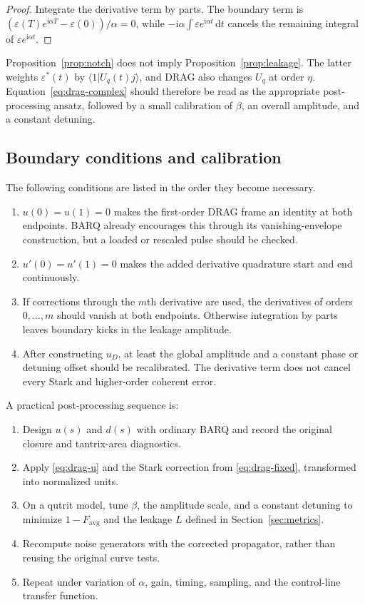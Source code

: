 \documentclass[11pt,a4paper]{article}
\theoremstyle{definition}
\newcommand{\braket}[2]{\langle #1\vert #2\rangle}
\newcommand{\dd}{\mathrm{d}}
\newcommand{\ii}{\mathrm{i}}
\newcommand{\eps}{\varepsilon}
\begin{document}
\begin{proof}
Integrate the derivative term by parts.  The boundary term is
\((\eps(T)e^{\ii\alpha T}-\eps(0))/\alpha=0\), while
\(-\ii\alpha\int\eps e^{\ii\alpha t}\,\dd t\) cancels the remaining integral of
\(\eps e^{\ii\alpha t}\).
\end{proof}

Proposition~\ref{prop:notch} does not imply
Proposition~\ref{prop:leakage}.  The latter weights \(\eps^*(t)\) by
\(\braket{1}{U_q(t)j}\), and DRAG also changes \(U_q\) at order \(\eta\).
Equation~\eqref{eq:drag-complex} should therefore be read as the appropriate
post-processing ansatz, followed by a small calibration of \(\beta\), an
overall amplitude, and a constant detuning.

\subsection{Boundary conditions and calibration}

The following conditions are listed in the order they become necessary.

\begin{enumerate}
  \item \(u(0)=u(1)=0\) makes the first-order DRAG frame an identity at both
        endpoints.  BARQ already encourages this through its vanishing-envelope
        construction, but a loaded or rescaled pulse should be checked.
  \item \(u'(0)=u'(1)=0\) makes the added derivative quadrature start and end
        continuously.
  \item If corrections through the \(m\)th derivative are used, the derivatives
        of orders \(0,\ldots,m\) should vanish at both endpoints.  Otherwise
        integration by parts leaves boundary kicks in the leakage amplitude.
  \item After constructing \(u_D\), at least the global amplitude and a
        constant phase or detuning offset should be recalibrated.  The
        derivative term does not cancel every Stark and higher-order coherent
        error.
\end{enumerate}

A practical post-processing sequence is:

\begin{enumerate}
  \item Design \(u(s)\) and \(d(s)\) with ordinary BARQ and record the original
        closure and tantrix-area diagnostics.
  \item Apply \eqref{eq:drag-u} and the Stark correction from
        \eqref{eq:drag-fixed}, transformed into normalized units.
  \item On a qutrit model, tune \(\beta\), the amplitude scale, and a constant
        detuning to minimize \(1-F_{\mathrm{avg}}\) and the leakage \(L\)
        defined in Section~\ref{sec:metrics}.
  \item Recompute noise generators with the corrected propagator, rather than
        reusing the original curve tests.
  \item Repeat under variation of \(\alpha\), gain, timing, sampling, and the
        control-line transfer function.
\end{enumerate}
\end{document}
